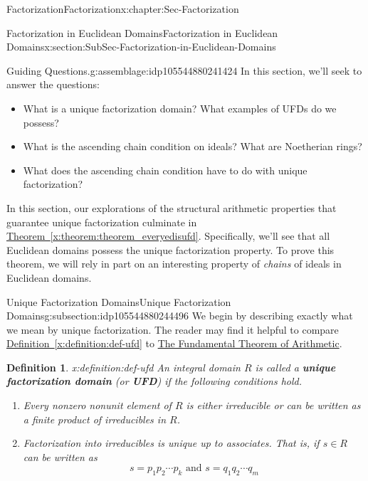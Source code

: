 \documentclass[oneside,10pt,]{book}
\newcommand{\xreffont}{\relax}
\newcommand{\terminology}[1]{\textbf{#1}}
\numberwithin{equation}{section}
\newtheorem{definition}[theorem]{Definition}
\begin{document}
\begin{chapterptx}{Factorization}{}{Factorization}{}{}{x:chapter:Sec-Factorization}
\begin{sectionptx}{Factorization in Euclidean Domains}{}{Factorization in Euclidean Domains}{}{}{x:section:SubSec-Factorization-in-Euclidean-Domains}
\begin{assemblage}{Guiding Questions.}{g:assemblage:idp105544880241424}
In this section, we'll seek to answer the questions: %
\begin{itemize}[label=\textbullet]
\item{}What is a unique factorization domain? What examples of UFDs do we possess?%
\item{}What is the ascending chain condition on ideals? What are Noetherian rings?%
\item{}What does the ascending chain condition have to do with unique factorization?%
\end{itemize}
%
\end{assemblage}
\begin{introduction}{}%
In this section, our explorations of the structural arithmetic properties that guarantee unique factorization culminate in \hyperref[x:theorem:theorem_everyedisufd]{Theorem~{\xreffont\ref{x:theorem:theorem_everyedisufd}}}. Specifically, we'll see that all Euclidean domains possess the unique factorization property. To prove this theorem, we will rely in part on an interesting property of \emph{chains} of ideals in Euclidean domains.%
\end{introduction}%
%
%
\typeout{************************************************}
\typeout{************************************************}
%
\begin{subsectionptx}{Unique Factorization Domains}{}{Unique Factorization Domains}{}{}{g:subsection:idp105544880244496}
We begin by describing exactly what we mean by unique factorization. The reader may find it helpful to compare \hyperref[x:definition:def-ufd]{Definition~{\xreffont\ref{x:definition:def-ufd}}} to \hyperref[x:assemblage:ftarith]{The Fundamental Theorem of Arithmetic}.%
\begin{definition}{}{x:definition:def-ufd}%
%
An integral domain \(R\) is called a \terminology{unique factorization domain} (or \terminology{UFD}) if the following conditions hold.%
\begin{enumerate}
\item{}Every nonzero nonunit element of \(R\) is either irreducible or can be written as a finite product of irreducibles in \(R\).%
\item{}Factorization into irreducibles is unique up to associates. That is, if \(s\in R\) can be written as%
\begin{equation*}
s = p_1 p_2 \cdots p_k \text{ and }  s = q_1 q_2 \cdots q_m
\end{equation*}

\end{enumerate}
\end{definition}
\end{subsectionptx}
\end{sectionptx}
\end{chapterptx}
\end{document}
